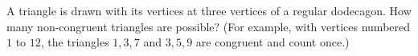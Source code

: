 A triangle is drawn with its vertices at three vertices of a regular dodecagon. How many non-congruent triangles are possible? (For example, with vertices numbered $1$ to $12$, the triangles $1,3,7$ and $3,5,9$ are congruent and count once.)
